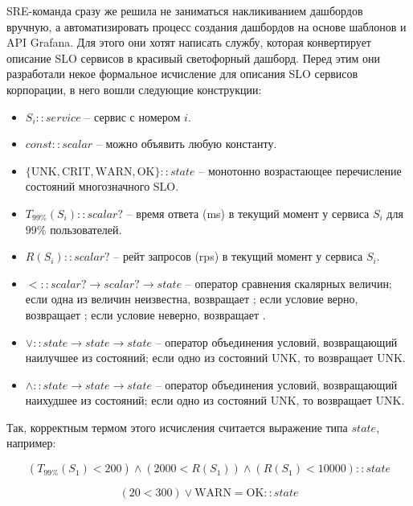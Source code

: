 \documentclass[12pt]{article}
\begin{document}
SRE-команда сразу же решила не заниматься накликиванием дашбордов вручную, а автоматизировать процесс
создания дашбордов на основе шаблонов и API Grafana. Для этого они хотят написать службу, которая конвертирует
описание SLO сервисов в красивый светофорный дашборд. Перед этим они разработали некое формальное исчисление
для описания SLO сервисов корпорации, в него вошли следующие конструкции:
\begin{itemize}
	\item $S_i :: service $ – сервис с номером $i$.
	\item $const :: scalar $ – можно объявить любую константу.
	\item $\{\text{UNK}, \text{CRIT}, \text{WARN}, \text{OK}\} :: state $ – монотонно возрастающее перечисление состояний многозначного SLO.
	\item $T_{99\%}(S_i) :: scalar? $ – время ответа (ms) в текущий момент у сервиса $S_i$ для $99\%$ пользователей.
	\item $R(S_i) :: scalar? $ – рейт запросов (rps) в текущий момент у сервиса $S_i$.
	\item $ < :: scalar? \rightarrow scalar? \rightarrow state $ – оператор сравнения скалярных величин; если одна из величин неизвестна, возвращает ; если условие верно, возвращает ; если условие неверно, возвращает .
	\item $ \vee  :: state \rightarrow state \rightarrow state $ – оператор объединения условий, возвращающий наилучшее из состояний; если одно из состояний UNK, то возвращает UNK.
	\item $ \wedge  :: state \rightarrow state \rightarrow state $ – оператор объединения условий, возвращающий наихудшее из состояний; если одно из состояний UNK, то возвращает UNK.
\end{itemize}

Так, корректным термом этого исчисления считается выражение типа $state$, например:

$$(T_{99\%}(S_1) < 200) \wedge (2000 < R(S_1)) \wedge (R(S_1) < 10000) :: state $$

$$(20 < 300) \vee \text{WARN} = \text{OK} :: state $$
\end{document}
